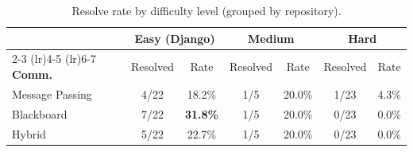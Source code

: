 \begin{table}[t]
\centering
\caption{Resolve rate by difficulty level (grouped by repository).}
\label{tab:difficulty}
\begin{tabular}{lcccccc}
\toprule
 & \multicolumn{2}{c}{\textbf{Easy (Django)}} & \multicolumn{2}{c}{\textbf{Medium}} & \multicolumn{2}{c}{\textbf{Hard}} \\
\cmidrule(lr){2-3} \cmidrule(lr){4-5} \cmidrule(lr){6-7}
\textbf{Comm.} & Resolved & Rate & Resolved & Rate & Resolved & Rate \\
\midrule
Message Passing & 4/22 & 18.2\% & 1/5 & 20.0\% & 1/23 & 4.3\% \\
Blackboard      & 7/22 & \textbf{31.8\%} & 1/5 & 20.0\% & 0/23 & 0.0\% \\
Hybrid          & 5/22 & 22.7\% & 1/5 & 20.0\% & 0/23 & 0.0\% \\
\bottomrule
\end{tabular}
\end{table}